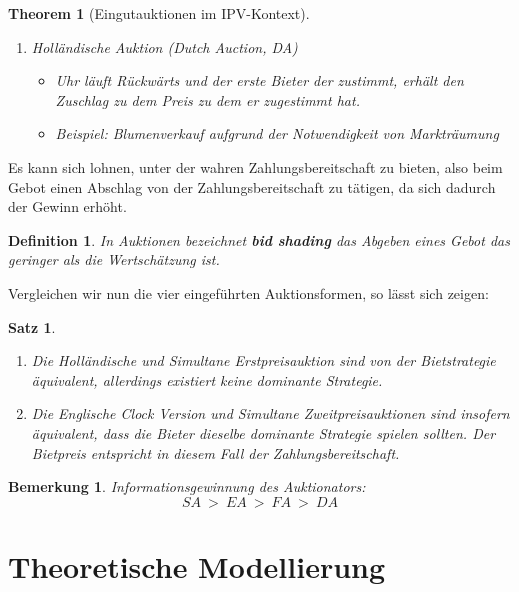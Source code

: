 \documentclass[12pt]{extreport} %
\theoremstyle{named}
\newtheorem*{unnamedtheorem*}{Theorem}
\theoremstyle{itshape}
\newtheorem{satz}[unnamedtheorem]{Satz}
\newtheorem*{definition}{Definition}
\theoremstyle{normal}
\newtheorem*{bemerkung}{Bemerkung}
\begin{document}
\begin{unnamedtheorem*}[Eingutauktionen im IPV-Kontext]
\begin{enumerate}
\begin{itemize}
				\item Preis: Vorletzter Preis ist Kaufpreis.
			\end{itemize}
		\item Holländische Auktion (Dutch Auction, DA)   
			\begin{itemize}
				\item Uhr läuft Rückwärts und der erste Bieter der zustimmt, erhält den Zuschlag zu dem Preis zu dem er zugestimmt hat.
				\item Beispiel: Blumenverkauf aufgrund der Notwendigkeit von Markträumung
			\end{itemize}
	\end{enumerate}
\end{unnamedtheorem*}

Es kann sich lohnen, unter der wahren Zahlungsbereitschaft zu bieten, also beim Gebot einen Abschlag von der Zahlungsbereitschaft zu tätigen, da sich dadurch der Gewinn erhöht.

\begin{definition}
	In Auktionen bezeichnet \textbf{bid shading} das Abgeben eines Gebot das geringer als die Wertschätzung ist.
\end{definition}

Vergleichen wir nun die vier eingeführten Auktionsformen, so lässt sich zeigen:

\begin{satz} ~\
	\begin{enumerate}
		\item Die Holländische und Simultane Erstpreisauktion sind von der Bietstrategie äquivalent, allerdings existiert keine dominante Strategie.
		\item Die Englische Clock Version und Simultane Zweitpreisauktionen sind insofern äquivalent, dass die Bieter dieselbe dominante Strategie spielen sollten. Der Bietpreis entspricht in diesem Fall der Zahlungsbereitschaft.
	\end{enumerate}
\end{satz}

\begin{bemerkung}
	Informationsgewinnung des Auktionators:	
	$$ SA ~ > ~ EA ~ > ~ FA ~ > ~ DA  $$
\end{bemerkung}


\chapter{Theoretische Modellierung}
\end{document}
